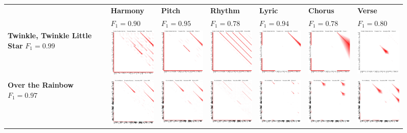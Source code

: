 \documentclass[phd,electronic,oneside,twosidetoc,letterpaper,chaptercenter,parttop,lol,lof,lot]{byumsphd}
\begin{document}
\begin{figure}[t!]
\centering
\newcommand{\colwidth}{1in}
\setlength\tabcolsep{1.5pt} %
\newcolumntype{D}{ >{\centering\arraybackslash} m{\colwidth} }
\begin{tabular}{CDDDDDD}
 & \textbf{Harmony} & \textbf{Pitch} & \textbf{Rhythm} & \textbf{Lyric} & \textbf{Chorus} & \textbf{Verse} \\
  & $F_{1}=0.90$ & $F_{1}=0.95$ & $F_{1}=0.78$ & $F_{1}=0.94$ & $F_{1}=0.78$ & $F_{1}=0.80$ \\
\textbf{Twinkle, Twinkle Little Star} $F_{1}=0.99$ & \includegraphics[width=\colwidth]{Twinkle__Twinkle__Little_Star_gen5848_id631_harmony} & \includegraphics[width=\colwidth]{Twinkle__Twinkle__Little_Star_gen5000_id544_pitch} & \includegraphics[width=\colwidth]{Twinkle__Twinkle__Little_Star_gen10000_id784_rhythm} & \includegraphics[width=\colwidth]{Twinkle__Twinkle__Little_Star_gen5000_id435_lyric} & \includegraphics[width=\colwidth]{Twinkle__Twinkle__Little_Star_gen5000_id399_chorus} & \includegraphics[width=\colwidth]{Twinkle__Twinkle__Little_Star_gen5000_id467_verse} \\
\textbf{Over the Rainbow} $F_{1}=0.97$ & \includegraphics[width=\colwidth]{Over_the_Rainbow_gen5848_id631_harmony} & \includegraphics[width=\colwidth]{Over_the_Rainbow_gen5000_id544_pitch} & \includegraphics[width=\colwidth]{Over_the_Rainbow_gen10000_id784_rhythm} & \includegraphics[width=\colwidth]{Over_the_Rainbow_gen5000_id435_lyric} & \includegraphics[width=\colwidth]{Over_the_Rainbow_gen5000_id399_chorus} & \includegraphics[width=\colwidth]{Over_the_Rainbow_gen5000_id467_verse} \\
\end{tabular}
\end{figure}
\end{document}
